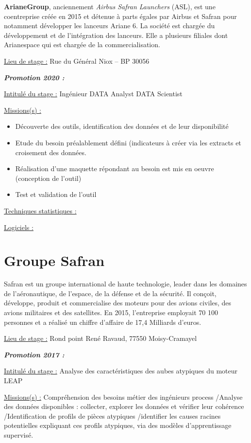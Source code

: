 \documentclass[
  letterpaper,
  DIV=11,
  numbers=noendperiod]{scrreprt}
\begin{document}
\textbf{ArianeGroup}, anciennement \emph{Airbus Safran Launchers} (ASL),
est une coentreprise créée en 2015 et détenue à parts égales par Airbus
et Safran pour notamment développer les lanceurs Ariane 6. La société
est chargée du développement et de l'intégration des lanceurs. Elle a
plusieurs filiales dont Arianespace qui est chargée de la
commercialisation.

\uline{Lieu de stage :} Rue du Général Niox -- BP 30056

\textbf{\emph{Promotion 2020 :}}

\uline{Intitulé du stage :} Ingénieur DATA Analyst DATA Scientist

\uline{Missions(s) :}

\begin{itemize}
\item
  Découverte des outils, identification des données et de leur
  disponibilité
\item
  Etude du besoin préalablement défini (indicateurs à créer via les
  extracts et croisement des données.
\item
  Réalisation d'une maquette répondant au besoin est mis en oeuvre
  (conception de l'outil)
\item
  Test et validation de l'outil
\end{itemize}

\uline{Techniques statistiques :}

\uline{Logiciels :}

\hypertarget{groupe-safran}{%
\section{\texorpdfstring{\textbf{Groupe
Safran}}{Groupe Safran}}\label{groupe-safran}}

Safran est un groupe international de haute technologie, leader dans les
domaines de l'aéronautique, de l'espace, de la défense et de la
sécurité. Il conçoit, développe, produit et commercialise des moteurs
pour des avions civiles, des avions militaires et des satellites. En
2015, l'entreprise employait 70 100 personnes et a réalisé un chiffre
d'affaire de 17,4 Milliards d'euros.

\uline{Lieu de stage :} Rond point René Ravaud, 77550 Moisy-Cramayel

\textbf{\emph{Promotion 2017 :}}

\uline{Intitulé du stage :} Analyse des caractéristiques des aubes
atypiques du moteur LEAP

\uline{Missions(s) :} Compréhension des besoins métier des ingénieurs
process /Analyse des données disponibles : collecter, explorer les
données et vérifier leur cohérence /Identification de profils de pièces
atypiques /identifier les causes racines potentielles expliquant ces
profils atypiques, via des modèles d'apprentissage supervisé.
\end{document}
